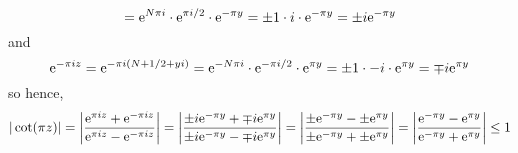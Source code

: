 \documentclass[../notes.tex]{subfiles}
\begin{document}
\begin{itemize}
\begin{itemize}
\begin{itemize}
\begin{itemize}
\begin{equation*}
                    = \e[N\pi i]\cdot\e[\pi i/2]\cdot\e[-\pi y]
                    = \pm 1\cdot i\cdot\e[-\pi y]
                    = \pm i\e[-\pi y]
                \end{equation*}
                and
                \begin{equation*}
                    \e[-\pi iz] = \e[-\pi i(N+1/2+yi)]
                    = \e[-N\pi i]\cdot\e[-\pi i/2]\cdot\e[\pi y]
                    = \pm 1\cdot -i\cdot\e[\pi y]
                    = \mp i\e[\pi y]
                \end{equation*}
                so hence,
                \begin{equation*}
                    |\cot(\pi z)| = \left| \frac{\e[\pi iz]+\e[-\pi iz]}{\e[\pi iz]-\e[-\pi iz]} \right|
                    = \left| \frac{\pm i\e[-\pi y]+\mp i\e[\pi y]}{\pm i\e[-\pi y]-\mp i\e[\pi y]} \right|
                    = \left| \frac{\pm\e[-\pi y]-\pm\e[\pi y]}{\pm\e[-\pi y]+\pm\e[\pi y]} \right|
                    = \left| \frac{\e[-\pi y]-\e[\pi y]}{\e[-\pi y]+\e[\pi y]} \right|
                    \leq 1
                \end{equation*}

\end{itemize}
\end{itemize}
\end{itemize}
\end{itemize}
\end{document}
